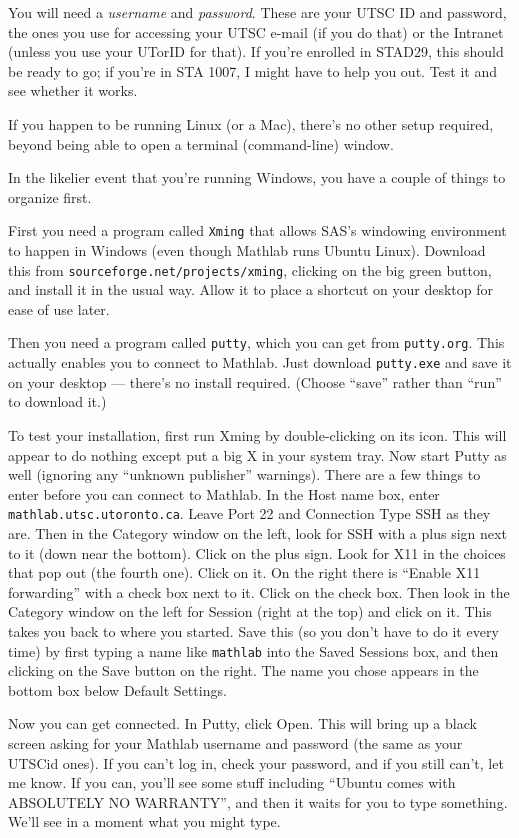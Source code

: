 \documentclass[11pt]{article}
\begin{document}
You will need a \emph{username} and \emph{password}. These are your
UTSC ID and password, the ones you use for accessing your UTSC e-mail
(if you do that) or the Intranet (unless you use your UTorID for
that). If you're enrolled in STAD29, this should be ready to go; if
you're in STA 1007, I might have to help you out. Test it and see
whether it works.

If you happen to be running Linux (or a Mac), 
there's no other setup required, beyond being able to open a terminal
(command-line) window. 

In the likelier event that you're running Windows, you have a couple
of things to organize first. 

First you need a program called \verb-Xming- that allows SAS's
windowing environment to happen in Windows (even though Mathlab runs
Ubuntu Linux). Download this from
\verb-sourceforge.net/projects/xming-, clicking on the big green
button, and install it in the usual way. Allow it to place a shortcut
on your desktop for ease of use later.

Then you need a program called \verb-putty-, which you can get from
\verb-putty.org-. This actually enables you to connect to
Mathlab. Just download \verb-putty.exe- and save it on your desktop
--- there's no install required. (Choose ``save'' rather than ``run''
to download it.)

To test your installation, first run Xming by double-clicking on its
icon. This will appear to do nothing except put a big X in your system
tray. Now start Putty as well (ignoring any ``unknown publisher''
warnings). There are a few things to enter before you can connect to
Mathlab. In the Host name box, enter
\verb-mathlab.utsc.utoronto.ca-. Leave Port 22 and Connection Type SSH
as they are. Then in the Category window on the left, look for SSH
with a plus sign next to it (down near the bottom). Click on the plus
sign. Look for X11 in the choices that pop out (the fourth one). Click
on it. On the right there is ``Enable X11 forwarding'' with a check
box next to it. Click on the check box. Then look in the Category
window on the left for Session (right at the top) and click on
it. This takes you back to where you started. Save this (so you don't
have to do it every time) by first typing a name like \verb-mathlab-
into the Saved Sessions box, and then clicking on the Save button on
the right. The name you chose appears in the bottom box below Default
Settings.

Now you can get connected. In Putty, click Open. This will bring up a
black screen asking for your Mathlab username and password (the same
as your UTSCid ones). If you can't log in, check your password, and if
you still can't, let me know. If you can, you'll see some stuff
including ``Ubuntu comes with ABSOLUTELY NO WARRANTY'', and then it
waits for you to type something. We'll see in a moment what you might
type. 
\end{document}
